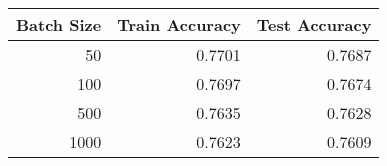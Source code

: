 \begin{tabular}{|r||r|r|}
\hline
Batch Size & Train Accuracy & Test Accuracy \\
\hline
50 & 0.7701 & 0.7687 \\
100 & 0.7697 & 0.7674 \\
500 & 0.7635 & 0.7628 \\
1000 & 0.7623 & 0.7609 \\
\hline
\end{tabular}

